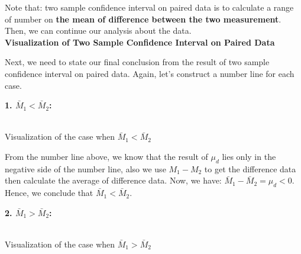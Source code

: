 Note that: two sample confidence interval on paired data is to calculate a range of number on \textbf{the mean of difference between the two measurement}. Then, we can continue our analysis about the data.\\

\textbf{Visualization of Two Sample Confidence Interval on Paired Data}

Next, we need to state our final conclusion from the result of two sample confidence interval on paired data. Again, let's construct a number line for each case.

\textbf{1. $\bar{M}_1 < \bar{M}_2$:}

\begin{center}
\vspace{0.5em}
\small\textbf{}\\Visualization of the case when $\bar{M}_1 < \bar{M}_2$
\end{center}

From the number line above, we know that the result of $\mu_d$ lies only in the negative side of the number line, also we use $M_1 - M_2$ to get the difference data then calculate the average of difference data. Now, we have: $\bar{M}_1 - \bar{M}_2 = \mu_d < 0$. Hence, we conclude that $\bar{M}_1 < \bar{M}_2.$

\textbf{2. $\bar{M}_1 > \bar{M}_2$:}

\begin{center}
\vspace{0.5em}
\small\textbf{}\\Visualization of the case when $\bar{M}_1 > \bar{M}_2$
\end{center}

